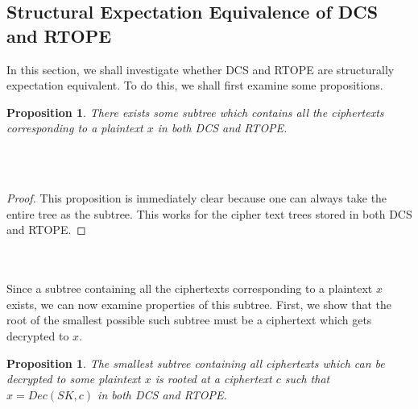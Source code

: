 \documentclass[12pt]{article}
\newtheorem{proposition}[theorem]{Proposition}
\begin{document}
\subsection{Structural Expectation Equivalence of DCS and RTOPE}
In this section, we shall investigate whether DCS and RTOPE are structurally expectation equivalent. To do this, we shall first examine some propositions. 
\begin{proposition}
 There exists some subtree which contains all the ciphertexts corresponding to a plaintext $x$ in both DCS and RTOPE.
\end{proposition}\\ \\
\begin{proof}
  This proposition is immediately clear because one can always take the entire tree as the subtree. This works for the cipher text trees stored in both DCS and RTOPE.
\end{proof}\\ \\
Since a subtree containing all the ciphertexts corresponding to a plaintext $x$ exists, we can now examine properties of this subtree. First, we show that the root of the smallest possible such subtree must be a ciphertext which gets decrypted to $x$. 
\begin{proposition}
  The smallest subtree containing all ciphertexts which can be decrypted to some plaintext $x$ is rooted at a ciphertext $c$ such that $x = Dec(SK, c)$ in both DCS and RTOPE.
\end{proposition}\\ \\
\end{document}
